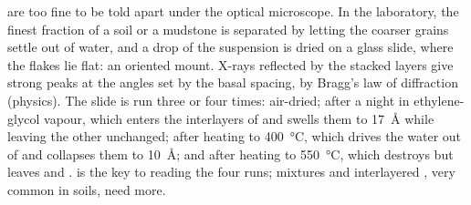 \begin{inthelab}
 are too fine to be told apart under the optical microscope. In
the laboratory, the finest fraction of a soil or a mudstone is separated by
letting the coarser grains settle out of water, and a drop of the suspension is
dried on a glass slide, where the flakes lie flat: an oriented mount. X-rays
reflected by the stacked layers give strong peaks at the angles set by the
basal spacing, by Bragg's law of diffraction (physics). The slide is run three
or four times: air-dried; after a night in ethylene-glycol vapour, which enters
the interlayers of  and swells them to \SI{17}{\angstrom} while leaving
the other  unchanged; after heating to \SI{400}{\celsius}, which drives
the water out of  and collapses them to \SI{10}{\angstrom}; and after
heating to \SI{550}{\celsius}, which destroys  but leaves  and
.  is the key to reading the four
runs; mixtures and interlayered , very common in soils, need more.
\end{inthelab}

